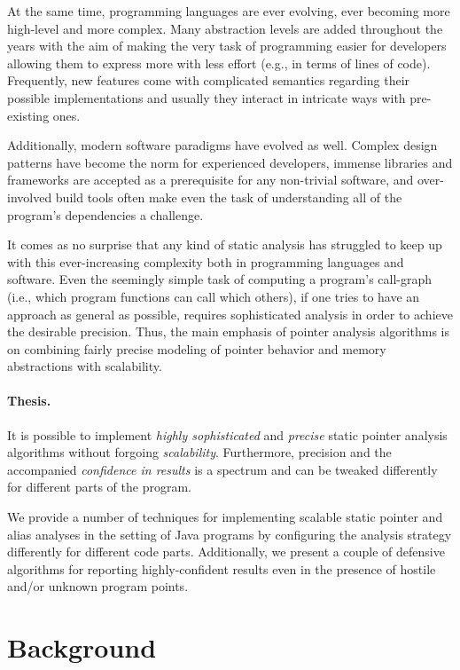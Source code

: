 At the same time, programming languages are ever evolving, ever becoming more
high-level and more complex. Many abstraction levels are added throughout the
years with the aim of making the very task of programming easier for developers
allowing them to express more with less effort (e.g., in terms of lines of
code). Frequently, new features come with complicated semantics regarding their
possible implementations and usually they interact in intricate ways with
pre-existing ones.

Additionally, modern software paradigms have evolved as well. Complex design
patterns have become the norm for experienced developers, immense libraries and
frameworks are accepted as a prerequisite for any non-trivial software, and
over-involved build tools often make even the task of understanding all of the
program's dependencies a challenge.

It comes as no surprise that any kind of static analysis has struggled to keep
up with this ever-increasing complexity both in programming languages and
software. Even the seemingly simple task of computing a program's call-graph
(i.e., which program functions can call which others), if one tries to have an
approach as general as possible, requires sophisticated analysis in order to
achieve the desirable precision. Thus, the main emphasis of pointer analysis
algorithms is on combining fairly precise modeling of pointer behavior and
memory abstractions with scalability.

\paragraph*{Thesis.}
\begin{displayquote}
It is possible to implement \emph{highly sophisticated} and \emph{precise}
	static pointer analysis algorithms without forgoing \emph{scalability}.
	Furthermore, precision and the accompanied \emph{confidence in results} is
	a spectrum and can be tweaked differently for different parts of the
	program.
\end{displayquote}

We provide a number of techniques for implementing scalable static pointer and
alias analyses in the setting of Java programs by configuring the analysis
strategy differently for different code parts. Additionally, we present a
couple of defensive algorithms for reporting highly-confident results even in
the presence of hostile and/or unknown program points.


\section{Background}

